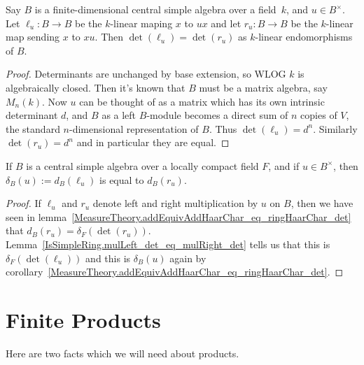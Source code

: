 \begin{lemma}
  \label{IsSimpleRing.mulLeft_det_eq_mulRight_det}
  \leanok
  Say $B$ is a finite-dimensional central simple algebra over a field~$k$,
  and $u\in B^\times$. Let $\ell_u:B\to B$ be the $k$-linear maping $x$ to $ux$ and
  let $r_u:B\to B$ be the $k$-linear map sending $x$ to $xu$. Then
  $\det(\ell_u)=\det(r_u)$ as $k$-linear endomorphisms of $B$.
\end{lemma}
\begin{proof}
  Determinants are unchanged by base extension, so WLOG $k$ is algebraically closed.
  Then it's known that $B$ must be a matrix algebra, say $M_n(k)$. Now $u$ can be thought
  of as a matrix which has its own intrinsic determinant $d$, and $B$ as a left $B$-module
  becomes a direct sum of $n$ copies of $V$, the standard $n$-dimensional representation of $B$.
  Thus $\det(\ell_u)=d^n$. Similarly $\det(r_u)=d^n$ and in particular they are equal.
\end{proof}

\begin{corollary}
  \label{IsSimpleRing.ringHaarChar_eq_addEquivAddHaarChar_mulRight}
  \leanok
  If $B$ is a central simple algebra over a locally compact field $F$, and if $u\in B^\times$,
  then $\delta_B(u):=d_B(\ell_u)$ is equal to $d_B(r_u)$.
\end{corollary}
\begin{proof}
  \leanok
  If $\ell_u$ and $r_u$ denote left and right multiplication by $u$ on $B$, then we have
  seen in lemma~\ref{MeasureTheory.addEquivAddHaarChar_eq_ringHaarChar_det} that $d_B(r_u)=\delta_F(\det(r_u))$.
  Lemma~\ref{IsSimpleRing.mulLeft_det_eq_mulRight_det} tells
  us that this is $\delta_F(\det(\ell_u))$ and this is $\delta_B(u)$ again by
  corollary~\ref{MeasureTheory.addEquivAddHaarChar_eq_ringHaarChar_det}.
\end{proof}

\section{Finite Products}

Here are two facts which we will need about products.

